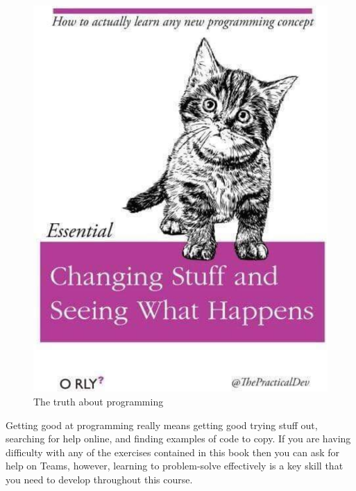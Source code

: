 \documentclass[]{book}
\begin{document}
\begin{figure}

{\centering \includegraphics[width=1\linewidth]{images/kitteh} 

}

\caption{The truth about programming}\label{fig:img-kitteh}
\end{figure}

Getting good at programming really means getting good trying stuff out, searching for help online, and finding examples of code to copy. If you are having difficulty with any of the exercises contained in this book then you can ask for help on Teams, however, learning to problem-solve effectively is a key skill that you need to develop throughout this course.
\end{document}
